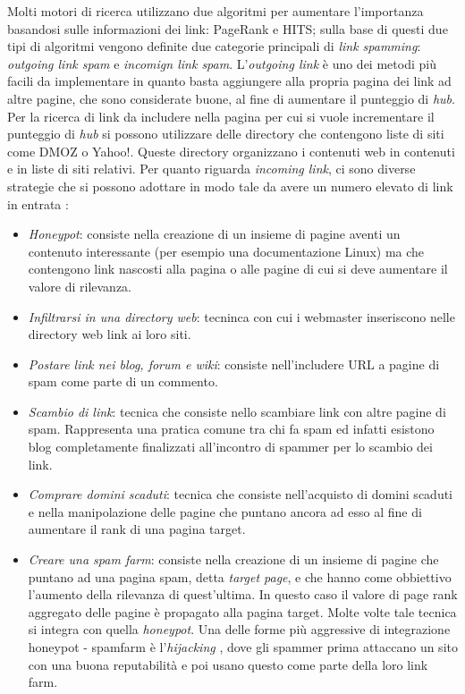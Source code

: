 Molti motori di ricerca utilizzano due algoritmi per aumentare l'importanza basandosi sulle informazioni dei link: PageRank e HITS; sulla base di questi due tipi di algoritmi vengono definite due categorie principali di \textit{link spamming}: \textit{outgoing link spam} e \textit{incomign link spam}. L'\textit{outgoing link} è uno dei metodi più facili da implementare in quanto basta aggiungere alla propria pagina dei link ad altre pagine, che sono considerate buone, al fine di aumentare il  punteggio di \textit{hub}. Per la ricerca di link da includere nella pagina per cui si vuole incrementare il punteggio di \textit{hub} si possono utilizzare delle directory che contengono liste di siti come DMOZ o Yahoo!. Queste directory organizzano i contenuti web in contenuti e in liste di siti relativi. Per quanto riguarda \textit{incoming link}, ci sono diverse strategie che si possono adottare in modo tale da avere un numero elevato di link in entrata \cite{ilprints646}:
\begin{itemize}
\item \textit{Honeypot}: consiste nella creazione di un insieme di pagine aventi un contenuto interessante (per esempio una documentazione Linux) ma che contengono link nascosti alla pagina o alle pagine di cui si deve aumentare il valore di rilevanza.  
\item \textit{Infiltrarsi in una directory web}: tecninca con cui i webmaster inseriscono nelle directory web link ai loro siti.
\item \textit{Postare link nei blog, forum e wiki}: consiste nell'includere URL a pagine di spam come parte di un commento.
\item \textit{Scambio di link}: tecnica che consiste nello scambiare link con altre pagine di spam. Rappresenta una pratica comune tra chi fa spam ed infatti esistono blog completamente finalizzati all'incontro di spammer per lo scambio dei link.
\item \textit{Comprare domini scaduti}: tecnica che consiste nell'acquisto di domini scaduti e nella manipolazione delle pagine che puntano ancora ad esso al fine di aumentare il rank di una pagina target.
\item \textit{Creare una spam farm}: consiste nella creazione di un insieme di pagine che puntano ad una pagina spam, detta \textit{target page}, e che hanno come obbiettivo l'aumento della rilevanza di quest'ultima. In questo caso il valore di page rank aggregato delle pagine è propagato alla pagina target. Molte volte tale tecnica si integra con quella \textit{honeypot}. Una delle forme più aggressive di integrazione honeypot - spamfarm è l'\textit{hijacking} \cite{Spirin:2012:SWS:2207243.2207252}, dove gli spammer prima attaccano un sito con una buona reputabilità e poi usano questo come parte della loro link farm.
\end{itemize}
